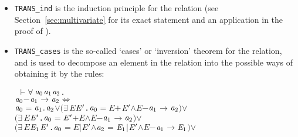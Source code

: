 \documentclass[GCNS]{yincog}
\renewcommand{\HOLBoundVar}[1]{\ensuremath{\mathit{#1}}}
\renewcommand{\HOLSymConst}[1]{#1}
\renewcommand{\HOLTokenConj}{\ensuremath{\wedge}}
\renewcommand{\HOLTokenEquiv}{\ensuremath{\Longleftrightarrow}}
\renewcommand{\HOLTokenExists}{\ensuremath{\exists \,}}
\renewcommand{\HOLTokenForall}{\ensuremath{\forall \,}}
\renewcommand{\HOLTokenTurnstile}{\ensuremath{\:\:\vdash}}
\renewcommand{\HOLTokenDisj}{\ensuremath{\vee}}
\theoremstyle{remark}
\theoremstyle{theorem}
\theoremstyle{remark}
\newcommand{\HOLTokenTransBegin}{$-$}
\newcommand{\HOLTokenTransEnd}{$\rightarrow$\xspace}
\begin{document}
\begin{itemize}
\begin{equation*}
\end{equation*}
%
\item \texttt{TRANS\_ind} is the induction principle for the relation (see
Section~\ref{sec:multivariate} for its exact statement and an application
in the proof of ).
%
\item \texttt{TRANS\_cases} is the so-called `cases' or `inversion' theorem
for the relation, and is used to decompose an element in the relation into
the possible ways of obtaining it by the rules:
%
\begin{alltt}
\HOLTokenTurnstile{} \HOLSymConst{\HOLTokenForall{}}\ensuremath{\HOLBoundVar{a}\sb{\mathrm{0}}} \ensuremath{\HOLBoundVar{a}\sb{\mathrm{1}}} \ensuremath{\HOLBoundVar{a}\sb{\mathrm{2}}}.
       \ensuremath{\HOLBoundVar{a}\sb{\mathrm{0}}} \HOLTokenTransBegin\ensuremath{\HOLBoundVar{a}\sb{\mathrm{1}}}\HOLTokenTransEnd \ensuremath{\HOLBoundVar{a}\sb{\mathrm{2}}} \HOLSymConst{\HOLTokenEquiv{}}
       \ensuremath{\HOLBoundVar{a}\sb{\mathrm{0}}} \HOLSymConst{\ensuremath{=}} \ensuremath{\HOLBoundVar{a}\sb{\mathrm{1}}}\HOLSymConst{\ensuremath{\ldotp}}\ensuremath{\HOLBoundVar{a}\sb{\mathrm{2}}} \HOLSymConst{\HOLTokenDisj{}} \ensuremath{(}\HOLSymConst{\HOLTokenExists{}}\HOLBoundVar{E} \ensuremath{\HOLBoundVar{E}\sp{\prime}}. \ensuremath{\HOLBoundVar{a}\sb{\mathrm{0}}} \HOLSymConst{\ensuremath{=}} \HOLBoundVar{E} \HOLSymConst{\ensuremath{+}} \ensuremath{\HOLBoundVar{E}\sp{\prime}} \HOLSymConst{\HOLTokenConj{}} \HOLBoundVar{E} \HOLTokenTransBegin\ensuremath{\HOLBoundVar{a}\sb{\mathrm{1}}}\HOLTokenTransEnd \ensuremath{\HOLBoundVar{a}\sb{\mathrm{2}}}\ensuremath{)} \HOLSymConst{\HOLTokenDisj{}}
       \ensuremath{(}\HOLSymConst{\HOLTokenExists{}}\HOLBoundVar{E} \ensuremath{\HOLBoundVar{E}\sp{\prime}}. \ensuremath{\HOLBoundVar{a}\sb{\mathrm{0}}} \HOLSymConst{\ensuremath{=}} \ensuremath{\HOLBoundVar{E}\sp{\prime}} \HOLSymConst{\ensuremath{+}} \HOLBoundVar{E} \HOLSymConst{\HOLTokenConj{}} \HOLBoundVar{E} \HOLTokenTransBegin\ensuremath{\HOLBoundVar{a}\sb{\mathrm{1}}}\HOLTokenTransEnd \ensuremath{\HOLBoundVar{a}\sb{\mathrm{2}}}\ensuremath{)} \HOLSymConst{\HOLTokenDisj{}}
       \ensuremath{(}\HOLSymConst{\HOLTokenExists{}}\HOLBoundVar{E} \ensuremath{\HOLBoundVar{E}\sb{\mathrm{1}}} \ensuremath{\HOLBoundVar{E}\sp{\prime}}. \ensuremath{\HOLBoundVar{a}\sb{\mathrm{0}}} \HOLSymConst{\ensuremath{=}} \HOLBoundVar{E} \HOLSymConst{\ensuremath{\mid}} \ensuremath{\HOLBoundVar{E}\sp{\prime}} \HOLSymConst{\HOLTokenConj{}} \ensuremath{\HOLBoundVar{a}\sb{\mathrm{2}}} \HOLSymConst{\ensuremath{=}} \ensuremath{\HOLBoundVar{E}\sb{\mathrm{1}}} \HOLSymConst{\ensuremath{\mid}} \ensuremath{\HOLBoundVar{E}\sp{\prime}} \HOLSymConst{\HOLTokenConj{}} \HOLBoundVar{E} \HOLTokenTransBegin\ensuremath{\HOLBoundVar{a}\sb{\mathrm{1}}}\HOLTokenTransEnd \ensuremath{\HOLBoundVar{E}\sb{\mathrm{1}}}\ensuremath{)} \HOLSymConst{\HOLTokenDisj{}}

\end{alltt}
\end{itemize}
\end{document}
